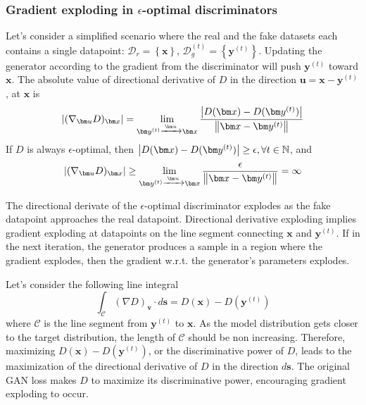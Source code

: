 \documentclass{article} %
\begin{document}
\subsubsection{Gradient exploding in $\epsilon$-optimal discriminators}\label{gradExploding}
Let's consider a simplified scenario where the real and the fake datasets each contains a single datapoint:  $\mathcal{D}_r = \left\lbrace \bm x \right\rbrace$, $\mathcal{D}_g^{(t)} = \left\lbrace \bm y^{(t)} \right\rbrace$.
Updating the generator according to the gradient from the discriminator will push $\bm y^{(t)}$ toward $\bm x$. The absolute value of directional derivative of $D$ in the direction $\bm u = \bm x - \bm y^{(t)}$, at $\bm x$ is 
\[ \abs{(\nabla_{\bm u}D)_{\bm x}}  = \lim_{\bm y^{(t)} \xrightarrow{\bm u} \bm x}{\frac{\abs{D(\bm x) - D(\bm y^{(t)})}}{\norm{\bm x - \bm y^{(t)}}}} \]
If $D$ is always $\epsilon$-optimal, then $\abs{D(\bm x) - D(\bm y^{(t)})} \ge \epsilon, \forall t \in \mathbb{N}$, and
\[ \abs{(\nabla_{\bm u}D)_{\bm x}}  \ge \lim_{\bm y^{(t)} \xrightarrow{\bm u} \bm x}{\frac{\epsilon}{\norm{\bm x - \bm y^{(t)}}}} = \infty \]

The directional derivate of the $\epsilon$-optimal discriminator explodes as the fake datapoint approaches the real datapoint. 
Directional derivative exploding implies gradient exploding at datapoints on the line segment connecting $\bm x$ and $\bm y^{(t)}$.
If in the next iteration, the generator produces a sample in a region where the gradient explodes, then the gradient w.r.t. the generator's parameters explodes.

Let's consider the following line integral
\begin{equation}\label{eqn:lineInt}
\int_{\mathcal{C}}{(\nabla D)_{\bm v} \cdot d\bm s} = D(\bm x) - D(\bm y^{(t)}) 
\end{equation}
where $\mathcal{C}$ is the line segment from $\bm y^{(t)}$ to $\bm x$. As the model distribution gets closer to the target distribution, the length of $\mathcal{C}$ should be non increasing. Therefore, maximizing $D(\bm x) - D(\bm y^{(t)})$, or the discriminative power of $D$, leads to the maximization of the directional derivative of $D$ in the direction $d \bm s$. The original GAN loss makes $D$ to maximize its discriminative power, encouraging gradient exploding to occur.
\end{document}

